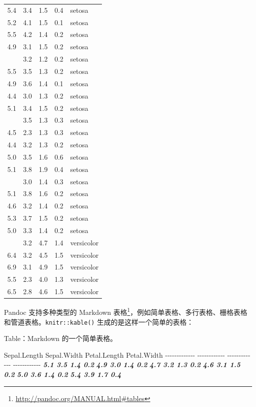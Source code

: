\documentclass[
  12pt,
]{krantz}
\newenvironment{Shaded}{\begin{snugshade}}{\end{snugshade}}
\newcommand{\InformationTok}[1]{\textcolor[rgb]{0.56,0.35,0.01}{\textbf{\textit{#1}}}}
\newcommand{\NormalTok}[1]{#1}
\renewcommand{\href}[2]{#2\footnote{\url{#1}}}
\theoremstyle{definition}
\theoremstyle{definition}
\theoremstyle{definition}
\theoremstyle{definition}
\theoremstyle{remark}
\begin{document}
\begin{longtable}[t]{rrrrl}
5.4 & 3.4 & 1.5 & 0.4 & setosa\\
5.2 & 4.1 & 1.5 & 0.1 & setosa\\
5.5 & 4.2 & 1.4 & 0.2 & setosa\\
4.9 & 3.1 & 1.5 & 0.2 & setosa\\
\addlinespace
5.0 & 3.2 & 1.2 & 0.2 & setosa\\
5.5 & 3.5 & 1.3 & 0.2 & setosa\\
4.9 & 3.6 & 1.4 & 0.1 & setosa\\
4.4 & 3.0 & 1.3 & 0.2 & setosa\\
5.1 & 3.4 & 1.5 & 0.2 & setosa\\
\addlinespace
5.0 & 3.5 & 1.3 & 0.3 & setosa\\
4.5 & 2.3 & 1.3 & 0.3 & setosa\\
4.4 & 3.2 & 1.3 & 0.2 & setosa\\
5.0 & 3.5 & 1.6 & 0.6 & setosa\\
5.1 & 3.8 & 1.9 & 0.4 & setosa\\
\addlinespace
4.8 & 3.0 & 1.4 & 0.3 & setosa\\
5.1 & 3.8 & 1.6 & 0.2 & setosa\\
4.6 & 3.2 & 1.4 & 0.2 & setosa\\
5.3 & 3.7 & 1.5 & 0.2 & setosa\\
5.0 & 3.3 & 1.4 & 0.2 & setosa\\
\addlinespace
7.0 & 3.2 & 4.7 & 1.4 & versicolor\\
6.4 & 3.2 & 4.5 & 1.5 & versicolor\\
6.9 & 3.1 & 4.9 & 1.5 & versicolor\\
5.5 & 2.3 & 4.0 & 1.3 & versicolor\\
6.5 & 2.8 & 4.6 & 1.5 & versicolor\\
\bottomrule
\end{longtable}

Pandoc 支持多种类型的 \href{http://pandoc.org/MANUAL.html\#tables}{Markdown 表格}，例如简单表格、多行表格、栅格表格和管道表格。\texttt{knitr::kable()} 生成的是这样一个简单的表格：

\begin{Shaded}
\begin{Highlighting}[]
\NormalTok{Table：Markdown 的一个简单表格。}

\NormalTok{ Sepal.Length   Sepal.Width   Petal.Length   Petal.Width}
\NormalTok{{-}{-}{-}{-}{-}{-}{-}{-}{-}{-}{-}{-}{-}  {-}{-}{-}{-}{-}{-}{-}{-}{-}{-}{-}{-}  {-}{-}{-}{-}{-}{-}{-}{-}{-}{-}{-}{-}{-}  {-}{-}{-}{-}{-}{-}{-}{-}{-}{-}{-}{-}}
\InformationTok{          5.1           3.5            1.4           0.2}
\InformationTok{          4.9           3.0            1.4           0.2}
\InformationTok{          4.7           3.2            1.3           0.2}
\InformationTok{          4.6           3.1            1.5           0.2}
\InformationTok{          5.0           3.6            1.4           0.2}
\InformationTok{          5.4           3.9            1.7           0.4}
\end{Highlighting}
\end{Shaded}
\end{document}
